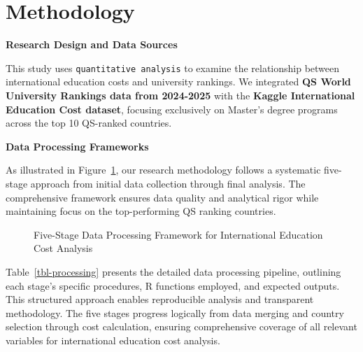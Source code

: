 \documentclass[
  letterpaper,
  DIV=11,
  numbers=noendperiod]{scrartcl}
\begin{document}
\section{Methodology}\label{methodology}

\textbf{Research Design and Data Sources}

This study uses \texttt{quantitative\ analysis} to examine the
relationship between international education costs and university
rankings. We integrated \textbf{QS World University Rankings data from
2024-2025} with the \textbf{Kaggle International Education Cost
dataset}, focusing exclusively on Master's degree programs across the
top 10 QS-ranked countries.

\textbf{Data Processing Frameworks}

As illustrated in Figure~\ref{fig-methodology-flowchart}, our research
methodology follows a systematic five-stage approach from initial data
collection through final analysis. The comprehensive framework ensures
data quality and analytical rigor while maintaining focus on the
top-performing QS ranking countries.

\begin{figure}


\caption{\label{fig-methodology-flowchart}Five-Stage Data Processing
Framework for International Education Cost Analysis}

\end{figure}%

Table~\ref{tbl-processing} presents the detailed data processing
pipeline, outlining each stage's specific procedures, R functions
employed, and expected outputs. This structured approach enables
reproducible analysis and transparent methodology. The five stages
progress logically from data merging and country selection through cost
calculation, ensuring comprehensive coverage of all relevant variables
for international education cost analysis.
\end{document}
